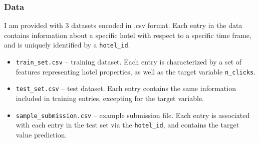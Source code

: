 \documentclass[preprint,12pt,3p]{elsarticle}
\begin{document}
\subsubsection{Data}
I am provided with 3 datasets encoded in .csv format. Each entry in the data contains information about a specific hotel with respect to a specific time frame, and is uniquely identified by a \verb|hotel_id|.
\begin{itemize}
	\item \verb|train_set.csv| -- training dataset. Each entry is characterized by a set of features representing hotel properties, as well as the target variable \verb|n_clicks|.
	\item \verb|test_set.csv| -- test dataset. Each entry contains the same information included in training entries, excepting for the target variable.
	\item \verb|sample_submission.csv| -- example submission file. Each entry is associated with each entry in the test set via the \verb|hotel_id|, and contains the target value prediction.
\end{itemize}
\end{document}
